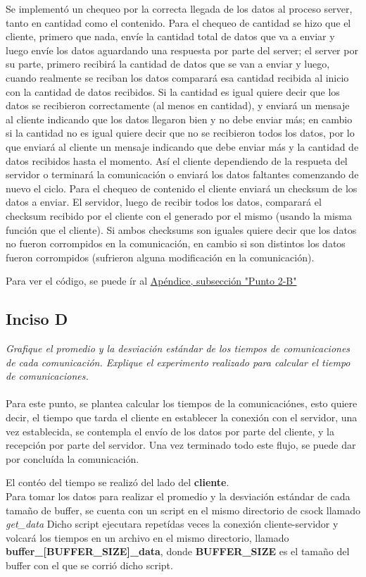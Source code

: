 \documentclass[12pt,journal,compsoc]{IEEEtran}
\begin{document}
Se implementó un chequeo por la correcta llegada de los datos al proceso server, tanto en cantidad como el contenido.
Para el chequeo de cantidad se hizo que el cliente, primero que nada, envíe la cantidad total de datos que va a enviar y luego envíe los datos aguardando una respuesta por parte del server; el server por su parte, primero recibirá la cantidad de datos que se van a enviar y luego, cuando realmente se reciban los datos comparará esa cantidad recibida al inicio con la cantidad de datos recibidos. Si la cantidad es igual quiere decir que los datos se recibieron correctamente (al menos en cantidad), y enviará un mensaje al cliente indicando que los datos llegaron bien y no debe enviar más; en cambio si la cantidad no es igual quiere decir que no se recibieron todos los datos, por lo que enviará al cliente un mensaje indicando que debe enviar más  y la cantidad de datos recibidos hasta el momento. Así el cliente dependiendo de la respueta del servidor o terminará la comunicación o enviará los datos faltantes comenzando de nuevo el ciclo.
Para el chequeo de contenido el cliente enviará un checksum de los datos a enviar. El servidor, luego de recibir todos los datos, comparará el checksum recibido por el cliente con el generado por el mismo (usando la misma función que el cliente). Si ambos checksums son iguales quiere decir que los datos no fueron corrompidos en la comunicación, en cambio si son distintos los datos fueron corrompidos (sufrieron alguna modificación en la comunicación).

Para ver el código, se puede ír al \hyperref[punto2b]{Apéndice, subsección "Punto 2-B"}

\subsection{Inciso D}
\textit{Grafique el promedio y la desviación estándar de los tiempos de comunicaciones de cada
comunicación. Explique el experimento realizado para calcular el tiempo de
comunicaciones.}\\\\
Para este punto, se plantea calcular los tiempos de la comunicaciónes, esto quiere decir,
el tiempo que tarda el cliente en establecer la conexión con el servidor, una vez establecida,
se contempla el envío de los datos por parte del cliente, y la recepción por parte del servidor.
Una vez terminado todo este flujo, se puede dar por concluída la comunicación.

El contéo del tiempo se realizó del lado del \textbf{cliente}.\\
Para tomar los datos para realizar el promedio y la desviación estándar de cada tamaño de buffer,
se cuenta con un script en el mismo directorio de csock llamado \textit{get\_data}
Dicho script ejecutara repetídas veces la conexión cliente-servidor y volcará los tiempos en un archivo
en el mismo directorio, llamado \textbf{buffer\_[BUFFER\_SIZE]\_data}, donde \textbf{BUFFER\_SIZE} es el tamaño
del buffer con el que se corrió dicho script.
\end{document}
